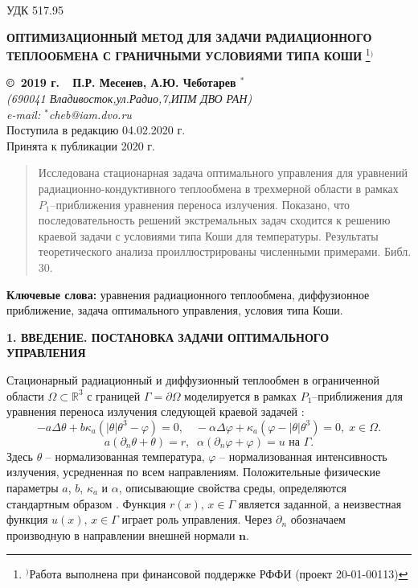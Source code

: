 \documentclass[12pt]{article}
\begin{document}
    УДК 517.95
    \begin{center}
    {\bf ОПТИМИЗАЦИОННЫЙ МЕТОД ДЛЯ ЗАДАЧИ РАДИАЦИОННОГО ТЕПЛООБМЕНА С ГРАНИЧНЫМИ УСЛОВИЯМИ ТИПА КОШИ}
        \footnote[{1}]{$^)$Работа выполнена при финансовой поддержке РФФИ (проект 20-01-00113)}$^)$
    \end{center}
    \begin{center}
    {\bf \copyright\  2019 г.\ \  П.Р. Месенев, А.Ю. Чеботарев $^{*}$}
        \\
        {\it (690041 Владивосток,ул.Радио,7,ИПМ ДВО РАН)\\
        e-mail:  $^{*}$cheb@iam.dvo.ru}\\
        {\small  Поступила в редакцию 04.02.2020 г.\\
        Принята к публикации 2020 г.}
    \end{center}

    \sloppy
    \begin{quote}
        \small
        Исследована стационарная задача оптимального управления для
        уравнений
        радиационно-кондуктивного теплообмена в трехмерной
        области в рамках $P_1$--приближения уравнения
        переноса излучения. Показано, что
        последовательность решений
        экстремальных задач
        сходится к решению краевой задачи с условиями типа Коши для температуры.
        Результаты теоретического анализа проиллюстрированы численными примерами. Библ. 30.
    \end{quote}
    {\bf Ключевые слова:} уравнения радиационного теплообмена, диффузионное
    приближение, задача оптимального управления, условия типа Коши.

    \begin{center}
        \textbf{1. ВВЕДЕНИЕ. ПОСТАНОВКА ЗАДАЧИ ОПТИМАЛЬНОГО УПРАВЛЕНИЯ}
    \end{center}

    Стационарный радиационный и диффузионный теплообмен в
    ограниченной области $\Omega\subset \mathbb{R}^3$ с границей
    $\Gamma=\partial\Omega$ моделируется в рамках $P_1$--приближения для уравнения
    переноса излучения следующей
    краевой задачей \cite{Modest,Kovt}:
    \begin{equation}
        \label{eq1}  - a\Delta\theta + b\kappa_a(|\theta|\theta^3- \varphi)=0,\quad
        -\alpha \Delta \varphi +
        \kappa_a(\varphi-|\theta|\theta^3)=0,\; x\in\Omega.
    \end{equation}
    \begin{equation}
        \label{bc1} a(\partial_n\theta+\theta) = r,\;\; \alpha(\partial_n\varphi+\varphi) = u \text{  на  }\Gamma.
    \end{equation}
    Здесь $\theta$ -- нормализованная температура, $\varphi$ --
    нормализованная интенсивность излучения, усредненная по всем
    направлениям.
    Положительные физические параметры $a$, $b$, $\kappa_a$ и $\alpha$, описывающие
    свойства среды, определяются стандартным образом \cite{Kovt}.
    Функция $r(x),\, x\in\Gamma$ является заданной, а неизвестная функция $u(x),\, x\in\Gamma$
    играет роль управления. Через $\partial_n$ обозначаем производную в направлении
    внешней нормали $\mathbf n$.
\end{document}
